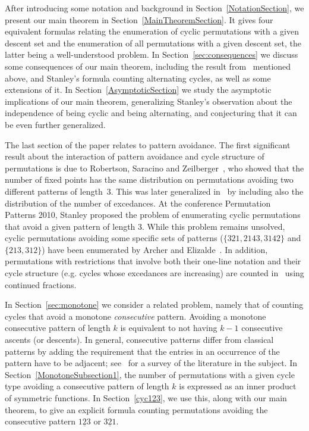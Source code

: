 \documentclass[12pt]{article}
\theoremstyle{definition}
\begin{document}
After introducing some notation and background in Section~\ref{NotationSection}, we present our main theorem in Section~\ref{MainTheoremSection}. 
It gives four equivalent formulas relating the enumeration of cyclic permutations with a given descent set and the enumeration of all permutations with a given descent set, the latter being a well-understood problem. In Section~\ref{sec:consequences} we discuss some consequences of our main theorem, including the result from~\cite{Elizalde} mentioned above, and Stanley's formula counting alternating cycles, as well as some extensions of it. In Section~\ref{AsymptoticSection} we study the asymptotic implications of our main theorem, generalizing Stanley's observation about the independence of being cyclic and being alternating, and conjecturing that it can be even further generalized.

The last section of the paper relates to pattern avoidance. The first significant result about the interaction of pattern avoidance and cycle structure of permutations is due to Robertson, Saracino and Zeilberger~\cite{RSZ},  who showed that the number of fixed points has the same distribution on permutations avoiding two different patterns of length~3. This was later generalized in~\cite{Elifpexc,EliPak} by including also the distribution of the number of excedances. 
At the conference Permutation Patterns 2010, Stanley proposed the problem of enumerating cyclic permutations that avoid a given pattern of length $3$. While this problem remains unsolved, cyclic permutations avoiding some specific sets of patterns ($\{321,2143,3142\}$ and $\{213,312\}$)
have been enumerated by Archer and Elizalde~\cite{ArcEli}. In addition, permutations with restrictions that involve both their one-line notation and their cycle structure (e.g. cycles whose excedances are increasing) are counted in~\cite{Elicont} using continued fractions. 

In Section~\ref{sec:monotone} we consider a related problem, namely that of counting cycles that avoid a monotone {\em consecutive} pattern.  Avoiding a monotone consecutive pattern of length $k$ is equivalent to not having $k-1$ consecutive ascents (or descents).
In general, consecutive patterns differ from classical patterns by adding the requirement that the entries in an occurrence of the pattern have to be adjacent; see~\cite{Eli_survey} for a survey of the literature in the subject. In Section~\ref{MonotoneSubsection1}, the number of permutations with a given cycle type avoiding a consecutive pattern of length $k$ is expressed as an inner product of symmetric functions. In Section~\ref{cyc123}, we use this, along with our main theorem, to give an explicit formula counting permutations avoiding the consecutive pattern $\underline{123}$ or $\underline{321}$.
\end{document}
